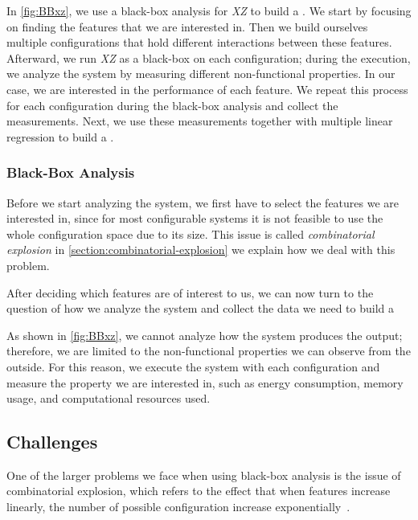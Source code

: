 In \autoref{fig:BBxz}, we use a black-box analysis for \textit{XZ} to build a \perfInfluenceModel.
We start by focusing on finding the features that we are interested in. 
Then we build ourselves multiple configurations that hold different interactions between these features.
Afterward, we run \textit{XZ} as a black-box on each configuration; during the execution, we analyze the system by measuring different non-functional properties.
In our case, we are interested in the performance of each feature. 
We repeat this process for each configuration during the black-box analysis and collect the measurements.
Next, we use these measurements together with multiple linear regression to build a \perfInfluenceModel.

\subsubsection{Black-Box Analysis}\label{ch:Black-Box-Analysis}

Before we start analyzing the system, we first have to select the features we are interested in, since for most configurable systems it is 
not feasible to use the whole configuration space due to its size. This issue is called \emph{combinatorial explosion} in \autoref{section:combinatorial-explosion}
we explain how we deal with this problem.

After deciding which features are of interest to us, we can now turn to the question 
of how we analyze the system and collect the data we need to build a \perfInfluenceModel

As shown in \autoref{fig:BBxz}, we cannot analyze how the system produces the output; 
therefore, we are limited to the non-functional properties we can observe from the outside. For this reason, 
we execute the system with each configuration and measure the property we are interested in, such as energy consumption, memory usage, 
and computational resources used.  

\subsection{Challenges}\label{section:combinatorial-explosion}
One of the larger problems we face when using black-box analysis is the issue of combinatorial explosion, 
which refers to the effect that when features increase linearly, the number of possible configuration
increase exponentially~\cite{Combinatorial-explosion}.

